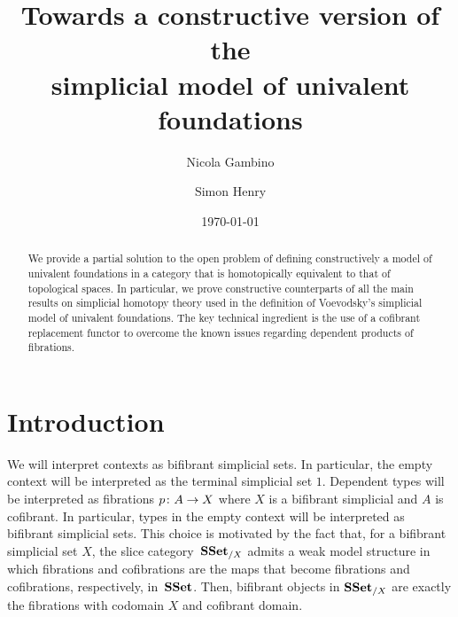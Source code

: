 \documentclass[reqno,10pt,a4paper,oneside,draft]{amsart}
\title[]{Towards a constructive version of the \\ simplicial model of univalent foundations}
\begin{document}
\begin{abstract}
We provide a partial solution to the open problem of defining constructively a model of univalent foundations in a category that is homotopically equivalent to that of topological spaces.
In particular, we prove constructive counterparts of all the main results on simplicial homotopy theory
used in the definition of Voevodsky's simplicial model of univalent foundations. The key technical ingredient
is the use of a cofibrant replacement functor to overcome the known issues regarding dependent products of fibrations.
\end{abstract}

\author{Nicola Gambino}
\address{School of Mathematics, University of Leeds, Leeds LS2 9JT, United Kingdom}


\author{Simon Henry}


 \date{\today}
 
 

\maketitle

\tableofcontents

\section{Introduction} 

We will interpret contexts as bifibrant simplicial sets. In particular,
the empty context will be interpreted as the terminal simplicial set $1$.  Dependent types 
will be interpreted as fibrations $p \colon A \to X$ where $X$ is a bifibrant simplicial and $A$ is cofibrant. In particular, types in the empty context will be interpreted as bifibrant simplicial sets. 
This choice is motivated by the fact that, for a bifibrant simplicial set $X$, the slice category~$\mathbf{SSet}_{/X}$ admits a weak model structure in which fibrations and cofibrations are the maps that become fibrations and cofibrations, respectively, in~$\mathbf{SSet}$. Then, bifibrant objects in $\mathbf{SSet}_{/X}$
are exactly the fibrations with codomain $X$ and cofibrant domain.
\end{document}
